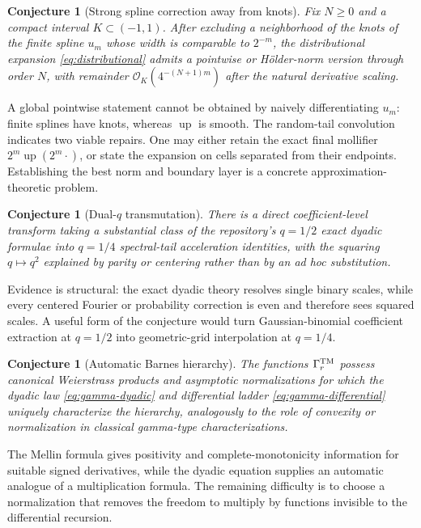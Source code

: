 \documentclass[11pt,oneside]{article}
\numberwithin{equation}{section}
\newtheorem{conjecture}[theorem]{Conjecture}
\theoremstyle{definition}
\theoremstyle{remark}
\newcommand{\Up}{\operatorname{up}}
\newcommand{\bigO}{\mathcal O}
\begin{document}
\begin{conjecture}[Strong spline correction away from knots]
\label{conj:strong-spline}
Fix $N\ge0$ and a compact interval $K\subset(-1,1)$.  After excluding a neighborhood of the
knots of the finite spline $u_m$ whose width is comparable to $2^{-m}$, the distributional
expansion \eqref{eq:distributional} admits a pointwise or Hölder-norm version through order
$N$, with remainder $\bigO_K(4^{-(N+1)m})$ after the natural derivative scaling.
\end{conjecture}

A global pointwise statement cannot be obtained by naively differentiating $u_m$: finite
splines have knots, whereas $\Up$ is smooth.  The random-tail convolution indicates two viable
repairs.  One may either retain the exact final mollifier $2^m\Up(2^m\cdot)$, or state the
expansion on cells separated from their endpoints.  Establishing the best norm and boundary
layer is a concrete approximation-theoretic problem.

\begin{conjecture}[Dual-$q$ transmutation]
\label{conj:dual-q}
There is a direct coefficient-level transform taking a substantial class of the repository's
$q=1/2$ exact dyadic formulae into $q=1/4$ spectral-tail acceleration identities, with the
squaring $q\mapsto q^2$ explained by parity or centering rather than by an ad hoc substitution.
\end{conjecture}

Evidence is structural: the exact dyadic theory resolves single binary scales, while every
centered Fourier or probability correction is even and therefore sees squared scales.  A
useful form of the conjecture would turn Gaussian-binomial coefficient extraction at
$q=1/2$ into geometric-grid interpolation at $q=1/4$.

\begin{conjecture}[Automatic Barnes hierarchy]
\label{conj:automatic-Barnes}
The functions $\Gamma_r^{\rm TM}$ possess canonical Weierstrass products and asymptotic
normalizations for which the dyadic law \eqref{eq:gamma-dyadic} and differential ladder
\eqref{eq:gamma-differential} uniquely characterize the hierarchy, analogously to the role of
convexity or normalization in classical gamma-type characterizations.
\end{conjecture}

The Mellin formula gives positivity and complete-monotonicity information for suitable signed
derivatives, while the dyadic equation supplies an automatic analogue of a multiplication
formula.  The remaining difficulty is to choose a normalization that removes the freedom to
multiply by functions invisible to the differential recursion.
\end{document}
